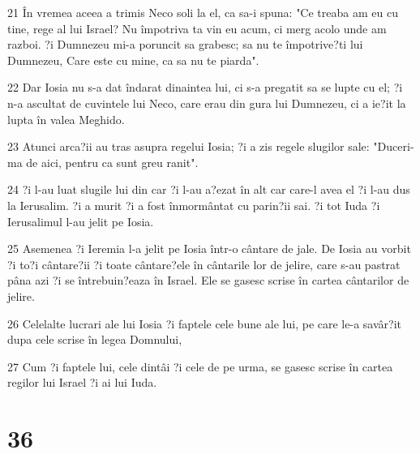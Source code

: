 \par 21 În vremea aceea a trimis Neco soli la el, ca sa-i spuna: "Ce treaba am eu cu tine, rege al lui Israel? Nu împotriva ta vin eu acum, ci merg acolo unde am razboi. ?i Dumnezeu mi-a poruncit sa grabesc; sa nu te împotrive?ti lui Dumnezeu, Care este cu mine, ca sa nu te piarda".
\par 22 Dar Iosia nu s-a dat îndarat dinaintea lui, ci s-a pregatit sa se lupte cu el; ?i n-a ascultat de cuvintele lui Neco, care erau din gura lui Dumnezeu, ci a ie?it la lupta în valea Meghido.
\par 23 Atunci arca?ii au tras asupra regelui Iosia; ?i a zis regele slugilor sale: "Duceri-ma de aici, pentru ca sunt greu ranit".
\par 24 ?i l-au luat slugile lui din car ?i l-au a?ezat în alt car care-l avea el ?i l-au dus la Ierusalim. ?i a murit ?i a fost înmormântat cu parin?ii sai. ?i tot Iuda ?i Ierusalimul l-au jelit pe Iosia.
\par 25 Asemenea ?i Ieremia l-a jelit pe Iosia într-o cântare de jale. De Iosia au vorbit ?i to?i cântare?ii ?i toate cântare?ele în cântarile lor de jelire, care s-au pastrat pâna azi ?i se întrebuin?eaza în Israel. Ele se gasesc scrise în cartea cântarilor de jelire.
\par 26 Celelalte lucrari ale lui Iosia ?i faptele cele bune ale lui, pe care le-a savâr?it dupa cele scrise în legea Domnului,
\par 27 Cum ?i faptele lui, cele dintâi ?i cele de pe urma, se gasesc scrise în cartea regilor lui Israel ?i ai lui Iuda.

\chapter{36}

